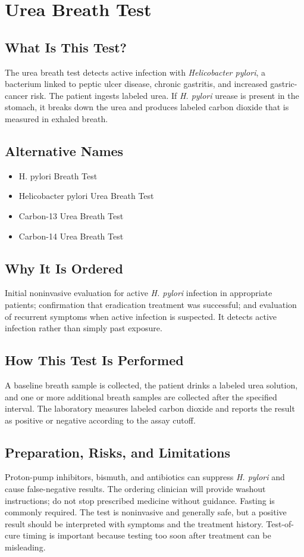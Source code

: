 \chapter{Urea Breath Test}

\section*{What Is This Test?}
The urea breath test detects active infection with \textit{Helicobacter pylori}, a bacterium linked to peptic ulcer disease, chronic gastritis, and increased gastric-cancer risk. The patient ingests labeled urea. If \textit{H. pylori} urease is present in the stomach, it breaks down the urea and produces labeled carbon dioxide that is measured in exhaled breath.

\section*{Alternative Names}
\begin{itemize}
  \item H. pylori Breath Test
  \item Helicobacter pylori Urea Breath Test
  \item Carbon-13 Urea Breath Test
  \item Carbon-14 Urea Breath Test
\end{itemize}
\section*{Why It Is Ordered}
Initial noninvasive evaluation for active \textit{H. pylori} infection in appropriate patients; confirmation that eradication treatment was successful; and evaluation of recurrent symptoms when active infection is suspected. It detects active infection rather than simply past exposure.

\section*{How This Test Is Performed}
A baseline breath sample is collected, the patient drinks a labeled urea solution, and one or more additional breath samples are collected after the specified interval. The laboratory measures labeled carbon dioxide and reports the result as positive or negative according to the assay cutoff.

\section*{Preparation, Risks, and Limitations}
Proton-pump inhibitors, bismuth, and antibiotics can suppress \textit{H. pylori} and cause false-negative results. The ordering clinician will provide washout instructions; do not stop prescribed medicine without guidance. Fasting is commonly required. The test is noninvasive and generally safe, but a positive result should be interpreted with symptoms and the treatment history. Test-of-cure timing is important because testing too soon after treatment can be misleading.

